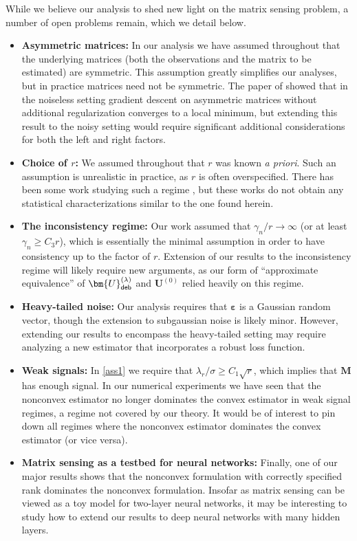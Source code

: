\documentclass[10pt]{article}
\newcommand{\eps}{\ensuremath{\varepsilon}}
\theoremstyle{definition}
\begin{document}
While we believe our analysis to shed new light on the matrix sensing problem, a number of open problems remain, which we detail below. 
\begin{itemize}
    \item \textbf{Asymmetric matrices:} In our analysis we have assumed throughout that the underlying matrices (both the observations and the matrix to be estimated) are symmetric.  This assumption greatly simplifies our analyses, but in practice matrices need not be symmetric.   The paper of \citet{ma_beyond_2021} showed that in the noiseless setting gradient descent on asymmetric matrices without additional regularization converges to a local minimum, but extending this result to the noisy setting would require significant additional considerations for both the left and right factors.
\item \textbf{Choice of $r$:} We assumed throughout that $r$ was known \emph{a priori}.  Such an assumption is unrealistic in practice, as $r$ is often overspecified. There has been some work studying such a regime \citep{stoger_small_2021,soltanolkotabi_implicit_2025,ma_geometric_2023}, but these works do not obtain any statistical characterizations similar to the one found herein.  
\item \textbf{The inconsistency regime:}  Our work assumed that $\gamma_n/r \to \infty$ (or at least $\gamma_n \geq C_3 r$), which is essentially the minimal assumption in order to have consistency up to the factor of $r$.  Extension of our results to the inconsistency regime will likely require new arguments, as our form of ``approximate equivalence'' of $\bm{U}_{{\sf deb}}^{(\lambda)}$ and $\bm{U}^{(0)}$ relied heavily on this regime.  
\item \textbf{Heavy-tailed noise:}  Our analysis requires that $\bm{\eps}$ is a Gaussian random vector, though the extension to subgaussian noise is likely minor.  However, extending our results to encompass the heavy-tailed setting may require analyzing a new estimator that incorporates a robust loss function.  
\item \textbf{Weak signals:} In \cref{ass1} we require that $\lambda_r/\sigma \geq C_1 \sqrt{r}$, which implies that $\bm{M}$ has enough signal.  In our numerical experiments  we have seen that the nonconvex estimator no longer dominates the convex estimator in weak signal regimes, a regime not covered by our theory.  It would be of interest to pin down all regimes where the nonconvex estimator dominates the convex estimator (or vice versa).  
\item \textbf{Matrix sensing as a testbed for neural networks:}  Finally, one of our major results shows that the nonconvex formulation with correctly specified rank dominates the nonconvex formulation.  Insofar as matrix sensing can be viewed as a toy model for two-layer neural networks, it may be interesting to study how to extend our results to deep neural networks with many hidden layers.      
\end{itemize}
\end{document}
